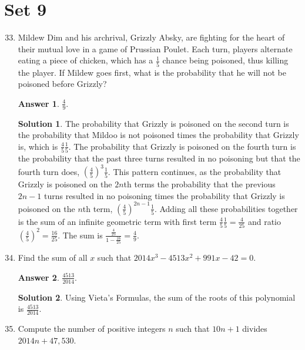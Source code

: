 \documentclass[11pt]{article}
\theoremstyle{definition}
\newtheorem*{solution}{Solution}
\newtheorem*{answer}{Answer}
\begin{document}
\section*{Set 9}
\begin{enumerate}
\setcounter{enumi}{32}

\item Mildew Dim and his archrival, Grizzly Absky, are fighting for the heart of their mutual love in a game of Prussian Poulet. Each turn, players alternate eating a piece of chicken, which has a $\frac{1}{5}$ chance being poisoned, thus killing the player. If Mildew goes first, what is the probability that he will not be poisoned before Grizzly?

\begin{answer}
$\frac{4}{9}$.
\end{answer}
\begin{solution} The probability that Grizzly is poisoned on the second turn is the probability that Mildoo is not poisoned times the probability that Grizzly is, which is $\frac{4}{5} \frac{1}{5}$. The probability that Grizzly is poisoned on the fourth turn is the probability that the past three turns resulted in no poisoning but that the fourth turn does, $(\frac{4}{5})^3 \frac{1}{5}$. This pattern continues, as the probability that Grizzly is poisoned on the $2n$th terms the probability that the previous $2n - 1$ turns resulted in no poisoning times the probability that Grizzly is poisoned on the $n$th term, $(\frac{4}{5})^{2n - 1} \frac{1}{5}$. Adding all these probabilities together is the sum of an infinite geometric term with first term $\frac{4}{5} \frac{1}{5} = \frac{4}{25}$ and ratio $(\frac{4}{5})^2 = \frac {16}{25}$. The sum is $\displaystyle \frac{\frac{4}{25}}{1 - \frac{16}{25}} = \boxed{\frac{4}{9}}$.

\end{solution}

\item Find the sum of all $x$ such that $2014x^3 - 4513x^2 + 991x - 42 = 0$.

\begin{answer}
$\frac{4513}{2014}$.
\end{answer}
\begin{solution} Using Vieta's Formulas, the sum of the roots of this polynomial is $\boxed{\frac{4513}{2014}}$.

\end{solution}

\item Compute the number of positive integers $n$ such that $10n + 1$ divides $2014n + 47,530$.


\end{enumerate}
\end{document}
